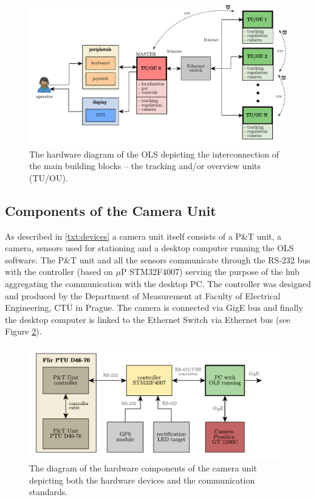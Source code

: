 \begin{figure}[htb]
	\centering
	\includegraphics[width=0.9\linewidth]{fig/hwsw_architecture.pdf}
	\caption{The hardware diagram of the OLS depicting the interconnection of the main building blocks -- the tracking and/or overview units (TU/OU).}
	\label{fig:hw_ols}
\end{figure}

\subsection{Components of the Camera Unit} \label{txt:components_of_cu}

As described in \ref{txt:devices} a camera unit itself consists of a P\&T unit, a camera, sensors used for stationing and a desktop computer running the OLS software. The P\&T unit and all the sensors communicate through the RS-232 bus with the controller (based on $\mu$P STM32F4007) serving the purpose of the hub aggregating the communication with the desktop PC. The controller was designed and produced by the Department of Measurement at Faculty of Electrical Engineering, CTU in Prague. The camera is connected via GigE bus and finally the desktop computer is linked to the Ethernet Switch via Ethernet bus (see Figure \ref{fig:hw_camera_unit}).

\begin{figure}[htb]
	\centering
	\includegraphics[width=0.8\linewidth]{fig/hw_camera_unit.pdf}
	\caption{The diagram of the hardware components of the camera unit depicting both the hardware devices and the communication standards.}
	\label{fig:hw_camera_unit}
\end{figure}

